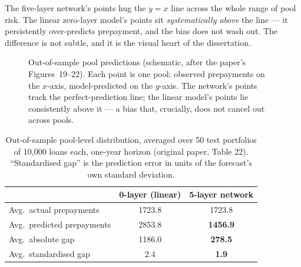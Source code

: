 \documentclass[11pt]{article}
\begin{document}
\begin{intuition}
The five-layer network's points hug the $y=x$ line across the whole range of pool risk. The
linear zero-layer model's points sit \emph{systematically above} the line --- it persistently
over-predicts prepayment, and the bias does not wash out. The difference is not subtle, and it
is the visual heart of the dissertation.
\end{intuition}

\begin{figure}[H]
\centering
{}
\caption{Out-of-sample pool predictions (schematic, after the paper's Figures~19--22). Each
point is one pool: observed prepayments on the $x$-axis, model-predicted on the $y$-axis.
The network's points track the perfect-prediction line; the linear model's points lie
consistently above it --- a bias that, crucially, does not cancel out across pools.}
\end{figure}

\begin{table}[H]
\centering
\caption{Out-of-sample pool-level distribution, averaged over 50 test portfolios of 10{,}000
loans each, one-year horizon (original paper, Table 22). ``Standardised gap'' is the
prediction error in units of the forecast's own standard deviation.}
\vspace{2pt}
\begin{tabular}{lcc}
\toprule
 & \textbf{0-layer (linear)} & \textbf{5-layer network} \\
\midrule
Avg.\ actual prepayments     & 1723.8 & 1723.8 \\
Avg.\ predicted prepayments  & 2853.8 & \textbf{1456.9} \\
Avg.\ absolute gap           & 1186.0 & \textbf{278.5} \\
Avg.\ standardised gap       & 2.4    & \textbf{1.9} \\
\bottomrule
\end{tabular}
\end{table}
\end{document}
